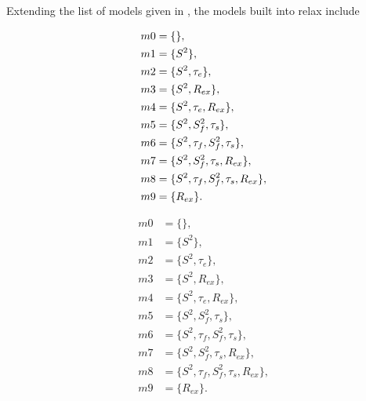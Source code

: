 Extending the list of models given in \citet{Mandel95, Fushman97, Orekhov99b, Korzhnev01, Zhuravleva04}, the models built into relax include
\begin{latexonly}
\begin{subequations}
\renewcommand{\theequation}{\theparentequation .\arabic{equation}}
\addtocounter{equation}{-1}
\begin{align}
 m0 &= \{\},                                   \label{model: m0} \\
 m1 &= \{S^2\},                                \label{model: m1} \\
 m2 &= \{S^2, \tau_e\},                        \label{model: m2} \\
 m3 &= \{S^2, R_{ex}\},                        \label{model: m3} \\
 m4 &= \{S^2, \tau_e, R_{ex}\},                \label{model: m4} \\
 m5 &= \{S^2, S^2_f, \tau_s\},                 \label{model: m5} \\
 m6 &= \{S^2, \tau_f, S^2_f, \tau_s\},         \label{model: m6} \\
 m7 &= \{S^2, S^2_f, \tau_s, R_{ex}\},         \label{model: m7} \\
 m8 &= \{S^2, \tau_f, S^2_f, \tau_s, R_{ex}\}, \label{model: m8} \\
 m9 &= \{R_{ex}\}.                             \label{model: m9}
\end{align}
\end{subequations}
\end{latexonly}
\begin{htmlonly}
\begin{subequations}
\begin{align}
 m0 &= \{\},                                   \label{model: m0} \\
 m1 &= \{S^2\},                                \label{model: m1} \\
 m2 &= \{S^2, \tau_e\},                        \label{model: m2} \\
 m3 &= \{S^2, R_{ex}\},                        \label{model: m3} \\
 m4 &= \{S^2, \tau_e, R_{ex}\},                \label{model: m4} \\
 m5 &= \{S^2, S^2_f, \tau_s\},                 \label{model: m5} \\
 m6 &= \{S^2, \tau_f, S^2_f, \tau_s\},         \label{model: m6} \\
 m7 &= \{S^2, S^2_f, \tau_s, R_{ex}\},         \label{model: m7} \\
 m8 &= \{S^2, \tau_f, S^2_f, \tau_s, R_{ex}\}, \label{model: m8} \\
 m9 &= \{R_{ex}\}.                             \label{model: m9}
\end{align}
\end{subequations}
\end{htmlonly}

